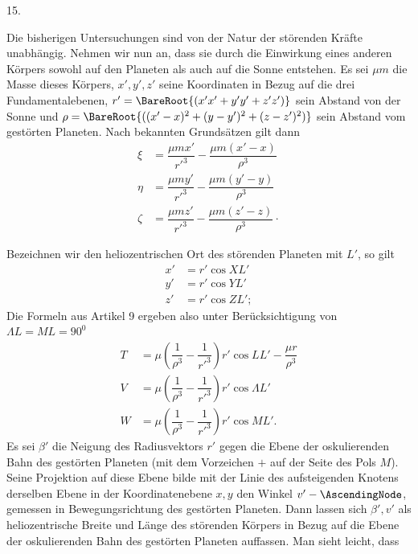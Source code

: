 \par{}\bigskip
{}
\begin{center}15.\end{center}
\noindent\hspace*{\parindent}Die bisherigen Untersuchungen sind von der Natur der störenden Kräfte unabhängig. Nehmen wir nun an, dass sie durch die Einwirkung eines anderen Körpers sowohl auf den Planeten als auch auf die Sonne entstehen. Es sei \(\mu m\) die Masse dieses Körpers, \(x',y',z'\) seine Koordinaten in Bezug auf die drei Fundamentalebenen, \(r'=\BareRoot{(x'x'+y'y'+z'z')}\) sein Abstand von der Sonne und \(\rho=\BareRoot{((x'-x)^2+(y-y')^2+(z-z')^2)}\) sein Abstand vom gestörten Planeten. Nach bekannten Grundsätzen gilt dann
\[
\begin{aligned}
\xi&=\dfrac{\mu mx'}{r'^3}-\dfrac{\mu m(x'-x)}{\rho^3}\\
\eta&=\dfrac{\mu my'}{r'^3}-\dfrac{\mu m(y'-y)}{\rho^3}\\
\zeta&=\dfrac{\mu mz'}{r'^3}-\dfrac{\mu m(z'-z)}{\rho^3}\mathpunct{\cdot}
\end{aligned}
\]
\par Bezeichnen wir den heliozentrischen Ort des störenden Planeten mit \(L'\), so gilt
\[
\begin{aligned}
x'&=r'\cos XL'\\
y'&=r'\cos YL'\\
z'&=r'\cos ZL';
\end{aligned}
\]
Die Formeln aus Artikel 9 ergeben also unter Berücksichtigung von \(\Lambda L=ML=90^0\)
\[
\begin{aligned}
T&=\mu\left(\dfrac{1}{\rho^3}-\dfrac{1}{r'^3}\right)r'\cos LL'-\dfrac{\mu r}{\rho^3}\\
V&=\mu\left(\dfrac{1}{\rho^3}-\dfrac{1}{r'^3}\right)r'\cos\Lambda L'\\
W&=\mu\left(\dfrac{1}{\rho^3}-\dfrac{1}{r'^3}\right)r'\cos ML'.
\end{aligned}
\]
Es sei \(\beta'\) die Neigung des Radiusvektors \(r'\) gegen die Ebene der oskulierenden Bahn des gestörten Planeten (mit dem Vorzeichen \(+\) auf der Seite des Pols \(M\)). Seine Projektion auf diese Ebene bilde mit der Linie des aufsteigenden Knotens derselben Ebene in der Koordinatenebene \(x,y\) den Winkel \(v'-\AscendingNode\), gemessen in Bewegungsrichtung des gestörten Planeten. Dann lassen sich \(\beta',v'\) als heliozentrische Breite und Länge des störenden Körpers in Bezug auf die Ebene der oskulierenden Bahn des gestörten Planeten auffassen. Man sieht leicht, dass
